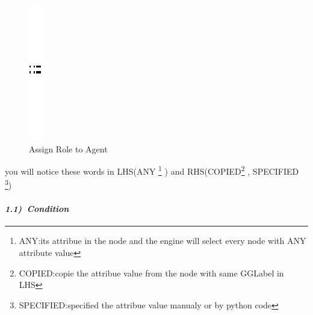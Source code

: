 \vspace{1cm}
\begin{figure}[th]
\centering
		\quad{}
		\includegraphics{ch3/img/sep}
		\quad{}
\caption{\label{fig:Create link between Agent and Role}Assign Role to Agent } 
\end{figure}

you will notice these words in LHS(ANY \footnote{ANY:its attribue in the node and the engine will select every node with ANY attribute value} ) and RHS(COPIED\footnote{COPIED:copie the attribue value from the node with same GGLabel in LHS} , SPECIFIED \footnote{SPECIFIED:specified the attribue value manualy or by python code})
 
  

\paragraph{\emph{1.1)~Condition } } 
 
